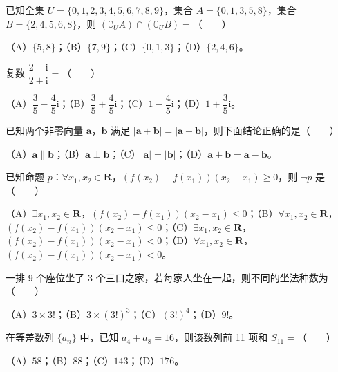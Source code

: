 \begin{question}
已知全集 $U=\{0,1,2,3,4,5,6,7,8,9\}$，集合 $A=\{0,1,3,5,8\}$，集合 $B=\{2,4,5,6,8\}$，则 $(\complement_U A)\cap(\complement_U B)=$\mbox{（　　）}

（A）$\{5,8\}$；（B）$\{7,9\}$；（C）$\{0,1,3\}$；（D）$\{2,4,6\}$。

\end{question}
\begin{question}
复数 $\dfrac{2-\mathrm i}{2+\mathrm i}=$\mbox{（　　）}

（A）$\dfrac35-\dfrac45\mathrm i$；（B）$\dfrac35+\dfrac45\mathrm i$；（C）$1-\dfrac45\mathrm i$；（D）$1+\dfrac35\mathrm i$。

\end{question}
\begin{question}
已知两个非零向量 $\boldsymbol a$，$\boldsymbol b$ 满足 $|\boldsymbol a+\boldsymbol b|=|\boldsymbol a-\boldsymbol b|$，则下面结论正确的是\mbox{（　　）}

（A）$\boldsymbol a\parallel\boldsymbol b$；（B）$\boldsymbol a\perp\boldsymbol b$；（C）$|\boldsymbol a|=|\boldsymbol b|$；（D）$\boldsymbol a+\boldsymbol b=\boldsymbol a-\boldsymbol b$。

\end{question}
\begin{question}
已知命题 $p$：$\forall x_1,x_2\in\mathbf R$，$(f(x_2)-f(x_1))(x_2-x_1)\geqslant 0$，则 $\neg p$ 是\mbox{（　　）}

（A）$\exists x_1,x_2\in\mathbf R$，$(f(x_2)-f(x_1))(x_2-x_1)\leqslant 0$；（B）$\forall x_1,x_2\in\mathbf R$，$(f(x_2)-f(x_1))(x_2-x_1)\leqslant 0$；（C）$\exists x_1,x_2\in\mathbf R$，$(f(x_2)-f(x_1))(x_2-x_1)<0$；（D）$\forall x_1,x_2\in\mathbf R$，$(f(x_2)-f(x_1))(x_2-x_1)<0$。

\end{question}
\begin{question}
一排 9 个座位坐了 3 个三口之家，若每家人坐在一起，则不同的坐法种数为\mbox{（　　）}

（A）$3\times3!$；（B）$3\times(3!)^3$；（C）$(3!)^4$；（D）$9!$。

\end{question}
\begin{question}
在等差数列 $\{a_n\}$ 中，已知 $a_4+a_8=16$，则该数列前 11 项和 $S_{11}=$\mbox{（　　）}

（A）$58$；（B）$88$；（C）$143$；（D）$176$。

\end{question}
